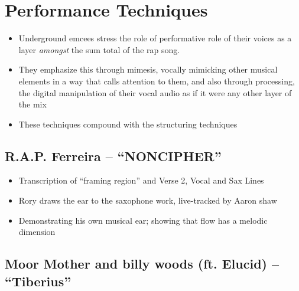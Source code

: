 \section{Performance Techniques}
    \begin{itemize}
        \item Underground emcees stress the role of performative role of their voices as a layer \emph{amongst} the sum total of the rap song. 
        \item They emphasize this through mimesis, vocally mimicking other musical elements in a way that calls attention to them, and also through processing, the digital manipulation of their vocal audio as if it were any other layer of the mix
        \item These techniques compound with the structuring techniques
    \end{itemize}

\subsection*{\centering R.A.P. Ferreira -- ``NONCIPHER''}
    \begin{itemize}
        \item Transcription of ``framing region'' and Verse 2, Vocal and Sax Lines
        \item Rory draws the ear to the saxophone work, live-tracked by Aaron shaw
        \item Demonstrating his own musical ear; showing that flow has a melodic dimension
    \end{itemize}
  
\subsection*{\centering Moor Mother and billy woods (ft. Elucid)  -- ``Tiberius''}
